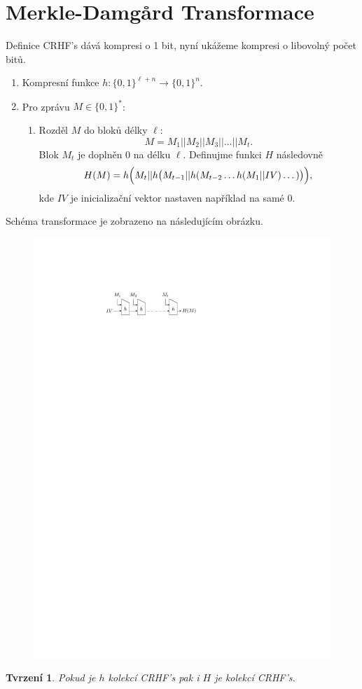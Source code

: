 \documentclass{article}
\newtheorem{proposition}{Tvrzení}
\begin{document}
\section{Merkle-Damgård Transformace}
\noindent Definice CRHF's dává kompresi o 1 bit, nyní ukážeme kompresi o libovolný počet bitů.
\begin{enumerate}
\item Kompresní funkce $h: \{0,1\}^{\ell + n} \to \{0,1\}^n$.
\item Pro zprávu $M \in \{0,1\}^*$:
\begin{enumerate}
\item Rozděl $M$ do bloků délky $\ell$:
\[
M = M_1 || M_2 || M_3 || \dots || M_t.
\]
Blok $M_t$ je doplněn 0 na délku $\ell$.
Definujme funkci $H$ následovně
\[
H(M) = h\Bigl(M_t || h\bigl(M_{t-1} || h(M_{t-2} \dots h(M_1 || IV) \dots)\bigr)\Bigr),
\]
kde $IV$ je inicializační vektor nastaven například na samé 0.
\end{enumerate}
\end{enumerate}
Schéma transformace je zobrazeno na následujícím obrázku.
\begin{figure}[h]
\centering
\includegraphics{MD_transformace.pdf}
\end{figure}
\begin{proposition}
Pokud je $h$ kolekcí CRHF's pak i $H$ je kolekcí CRHF's.
\end{proposition}
\end{document}
